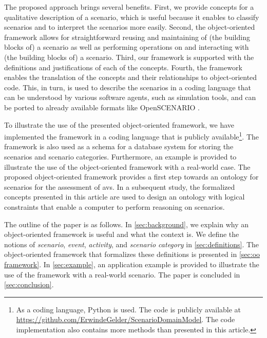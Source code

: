 The proposed approach brings several benefits.
First, we provide concepts for a qualitative description of a scenario, which is useful because it enables to classify scenarios and to interpret the scenarios more easily. 
Second, the object-oriented framework allows for straightforward reusing and maintaining of (the building blocks of) a scenario as well as performing operations on and interacting with (the building blocks of) a scenario.
Third, our framework is supported with the definitions and justifications of each of the \cendc\cstartd concepts\cendd\cstartc.
Fourth, the framework enables the translation of the \cendc\cstartd concepts and their relationships \cendd\cstartc to object-oriented code.
This, in turn, is used to describe the scenarios in a coding language that can be understood by various software agents, such as simulation tools\cendc\cstartd, and can be ported to already available formats like OpenSCENARIO \cite{openscenario}. \cendd

\cstartc To illustrate the use of the presented object-oriented framework, we have implemented the framework in a coding language that is publicly available\footnote{As a coding language, Python is used. The code is publicly available at \url{https://github.com/ErwindeGelder/ScenarioDomainModel}. \cstarte The code implementation also contains more methods than presented in this article.\cende}.
The framework is also used as a schema for a database system for storing the scenarios and scenario categories.
Furthermore, an example is provided to illustrate the use of the object-oriented framework with a real-world case.
The proposed object-oriented framework provides a first step towards an ontology \autocite{siricharoen2009ontology} for scenarios for the assessment of \acp{av}. In a subsequent study, the formalized concepts presented in this article are used to design an ontology with logical constraints that enable a computer to perform reasoning on scenarios.
\cendc

The outline of the paper is as follows. In \cref{sec:background}, we explain why an \cstartb object-oriented framework \cendb is useful and what the context is. 
We define the notions of \emph{scenario}, \emph{event}, \emph{activity}, and \emph{scenario category}  in \cref{sec:definitions}. 
The \cstartb object-oriented framework \cendb that formalizes these definitions is presented in \cref{sec:oo framework}. 
In \cref{sec:example}, an application example is provided to illustrate the use of the \cstartb framework \cendb with a real-world scenario. 
The paper is concluded in \cref{sec:conclusion}.
